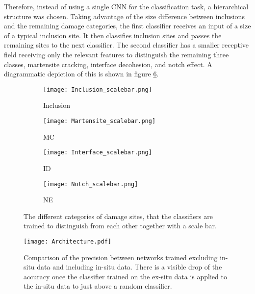 Therefore, instead of using a single CNN for the classification task, a hierarchical structure was chosen. Taking advantage of the size difference between inclusions and the remaining damage categories, the first classifier receives an input of a size of a typical inclusion site. It then classifies inclusion sites and passes the remaining sites to the next classifier. The second classifier has a smaller receptive field receiving only the relevant features to distinguish the remaining three classes, martensite cracking, interface decohesion, and notch effect. A diagrammatic depiction of this is shown in figure \ref{fig:Architecture}.\\
\begin{figure}
\centering
\begin{subfigure}{.25\textwidth}
\centering
  \texttt{[image: Inclusion\_scalebar.png]}
  \caption{Inclusion}
  \label{fig:Inclusion_scalebar}
\end{subfigure}%
\begin{subfigure}{.25\textwidth}
\centering
  \texttt{[image: Martensite\_scalebar.png]}
  \caption{MC}
  \label{fig:Martensite_scalebar}
\end{subfigure}%
\begin{subfigure}{.25\textwidth}
\centering
  \texttt{[image: Interface\_scalebar.png]}
  \caption{ID}
  \label{fig:Interface_scalebar}
\end{subfigure}%
\begin{subfigure}{.25\textwidth}
\centering
  \texttt{[image: Notch\_scalebar.png]}
  \caption{NE}
  \label{fig:Notch_scalebar}
\end{subfigure}%
\caption{The different categories of damage sites, that the classifiers are trained to distinguish from each other together with a scale bar.}
\label{fig:SizeDifference}
\end{figure}
\begin{figure}
\begin{center}
  \texttt{[image: Architecture.pdf]}
\caption{Comparison of the precision between networks trained excluding in-situ data and including in-situ data. There is a visible drop of the accuracy once the classifier trained on the ex-situ data is applied to the in-situ data to just above a random classifier.}
\label{fig:Architecture}
\end{center}
\end{figure}





